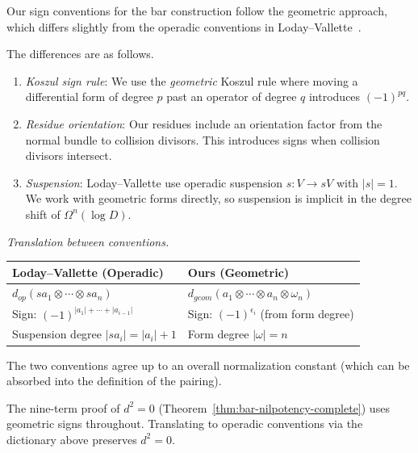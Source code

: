 \begin{remark}\label{rem:LV-signs}
Our sign conventions for the bar construction follow the geometric approach, which differs slightly from the operadic conventions in Loday--Vallette~\cite{LodayVallette}.

The differences are as follows.
\begin{enumerate}
\item \emph{Koszul sign rule}: We use the \emph{geometric} Koszul rule where moving a differential form of degree $p$ past an operator of degree $q$ introduces $(-1)^{pq}$.

\item \emph{Residue orientation}: Our residues include an orientation factor from the normal bundle to collision divisors. This introduces signs when collision divisors intersect.

\item \emph{Suspension}: Loday--Vallette use operadic suspension $s: V \to sV$ with $|s| = 1$. We work with geometric forms directly, so suspension is implicit in the degree shift of $\Omega^n(\log D)$.
\end{enumerate}

\emph{Translation between conventions.}
\begin{center}
\begin{tabular}{|>{\raggedright\arraybackslash}p{}|>{\raggedright\arraybackslash}p{}|}
\hline
\textbf{Loday--Vallette (Operadic)} & \textbf{Ours (Geometric)} \\
\hline
$d_{op}(s a_1 \otimes \cdots \otimes s a_n)$ & $d_{geom}(a_1 \otimes \cdots \otimes a_n \otimes \omega_n)$ \\
Sign: $(-1)^{|a_1| + \cdots + |a_{i-1}|}$ & Sign: $(-1)^{\epsilon_i}$ (from form degree) \\
Suspension degree $|s a_i| = |a_i| + 1$ & Form degree $|\omega| = n$ \\
\hline
\end{tabular}
\end{center}

The two conventions agree up to an overall normalization constant (which can be absorbed into the definition of the pairing).

The nine-term proof of $d^2 = 0$ (Theorem~\ref{thm:bar-nilpotency-complete}) uses geometric signs throughout. Translating to operadic conventions via the dictionary above preserves $d^2 = 0$.
\end{remark}

